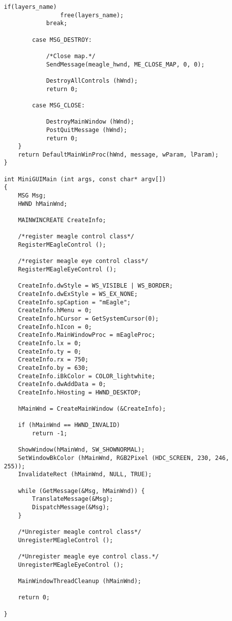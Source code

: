 \documentclass[a4paper]{article}
\begin{document}
\begin{lstlisting}[frame=trbl,caption=A Simple Program]
            if(layers_name)
                free(layers_name);
            break;

        case MSG_DESTROY:

            /*Close map.*/
            SendMessage(meagle_hwnd, ME_CLOSE_MAP, 0, 0);

            DestroyAllControls (hWnd);
            return 0;

        case MSG_CLOSE:

            DestroyMainWindow (hWnd);
            PostQuitMessage (hWnd);
            return 0;
    }
    return DefaultMainWinProc(hWnd, message, wParam, lParam);
}

int MiniGUIMain (int args, const char* argv[])
{
    MSG Msg;
    HWND hMainWnd;  

    MAINWINCREATE CreateInfo;

    /*register meagle control class*/
    RegisterMEagleControl ();

    /*register meagle eye control class*/
    RegisterMEagleEyeControl ();

    CreateInfo.dwStyle = WS_VISIBLE | WS_BORDER;
    CreateInfo.dwExStyle = WS_EX_NONE;
    CreateInfo.spCaption = "mEagle";
    CreateInfo.hMenu = 0;
    CreateInfo.hCursor = GetSystemCursor(0);
    CreateInfo.hIcon = 0;
    CreateInfo.MainWindowProc = mEagleProc;
    CreateInfo.lx = 0;
    CreateInfo.ty = 0;
    CreateInfo.rx = 750;
    CreateInfo.by = 630;
    CreateInfo.iBkColor = COLOR_lightwhite;
    CreateInfo.dwAddData = 0;
    CreateInfo.hHosting = HWND_DESKTOP;

    hMainWnd = CreateMainWindow (&CreateInfo);

    if (hMainWnd == HWND_INVALID)
        return -1;

    ShowWindow(hMainWnd, SW_SHOWNORMAL);
    SetWindowBkColor (hMainWnd, RGB2Pixel (HDC_SCREEN, 230, 246, 255));
    InvalidateRect (hMainWnd, NULL, TRUE);

    while (GetMessage(&Msg, hMainWnd)) {
        TranslateMessage(&Msg);
        DispatchMessage(&Msg);
    }

    /*Unregister meagle control class*/
    UnregisterMEagleControl ();

    /*Unregister meagle eye control class.*/
    UnregisterMEagleEyeControl ();

    MainWindowThreadCleanup (hMainWnd);

    return 0;

}
\end{lstlisting} 
\end{document}
